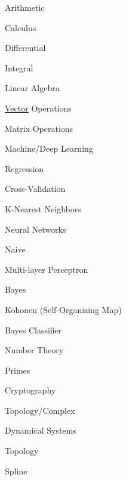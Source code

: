
\begin{DoxyEnumerate}
\item Arithmetic
\item Calculus
\begin{DoxyItemize}
\item Differential
\item Integral
\end{DoxyItemize}
\item Linear Algebra
\begin{DoxyItemize}
\item \mbox{\hyperlink{classVector}{Vector}} Operations
\item Matrix Operations
\end{DoxyItemize}
\item Machine/\+Deep Learning
\begin{DoxyItemize}
\item Regression
\item Cross-\/\+Validation
\item K-\/\+Nearest Neighbors
\item Neural Networks
\begin{DoxyItemize}
\item Naive
\item Multi-\/layer Perceptron
\item Bayes
\item Kohonen (Self-\/\+Organizing Map)
\end{DoxyItemize}
\item Bayes Classifier
\end{DoxyItemize}
\item Number Theory
\begin{DoxyItemize}
\item Primes
\item Cryptography
\end{DoxyItemize}
\item Topology/\+Complex
\begin{DoxyItemize}
\item Dynamical Systems
\item Topology
\item Spline 
\end{DoxyItemize}
\end{DoxyEnumerate}